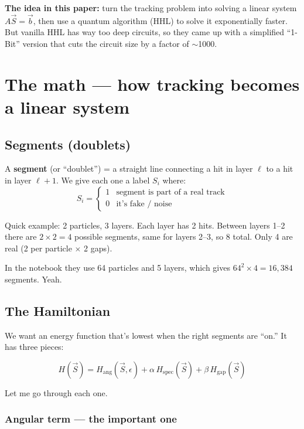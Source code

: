 \documentclass[11pt, a4paper]{article}
\begin{document}
\medskip
\textbf{The idea in this paper:} turn the tracking problem into solving a
linear system $A\vec{S} = \vec{b}$, then use a quantum algorithm (HHL) to
solve it exponentially faster. But vanilla HHL has way too deep circuits, so
they came up with a simplified ``1-Bit'' version that cuts the circuit size
by a factor of $\sim$1000.

\newpage
\section{The math --- how tracking becomes a linear system}

\subsection{Segments (doublets)}

A \textbf{segment} (or ``doublet'') = a straight line connecting a hit in
layer $\ell$ to a hit in layer $\ell+1$. We give each one a label $S_i$
where:
\[
  S_i = \begin{cases} 1 & \text{segment is part of a real track} \\
                       0 & \text{it's fake / noise} \end{cases}
\]

Quick example: 2 particles, 3 layers. Each layer has 2 hits. Between
layers 1--2 there are $2 \times 2 = 4$ possible segments, same for layers
2--3, so 8 total. Only 4 are real (2 per particle $\times$ 2 gaps).

In the notebook they use 64 particles and 5 layers, which gives
$64^2 \times 4 = 16{,}384$ segments. Yeah.

\subsection{The Hamiltonian}

We want an energy function that's lowest when the right segments are ``on.''
It has three pieces:

\begin{equation}
  \boxed{H(\vec{S}) = H_{\text{ang}}(\vec{S}, \epsilon) +
  \alpha\, H_{\text{spec}}(\vec{S}) + \beta\, H_{\text{gap}}(\vec{S})}
\end{equation}

Let me go through each one.

\subsubsection{Angular term --- the important one}
\end{document}
